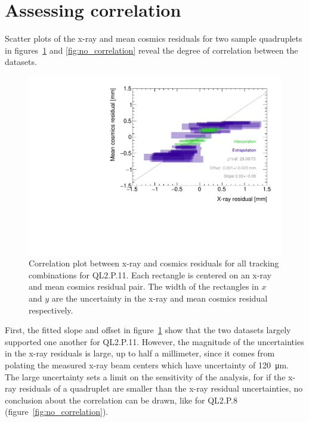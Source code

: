 \section{Assessing correlation}
Scatter plots of the x-ray and mean cosmics residuals for two sample quadruplets in figures~\ref{fig:correlation} and \ref{fig:no_correlation} reveal the degree of correlation between the datasets.

\begin{figure}
    \centering
    \includegraphics[width = \textwidth]{figures/figure_QL2P11_3100V_2021-08-05_QL2P11_local_cosmic_and_xray_data_correlation_plot.pdf}
    \caption{Correlation plot between x-ray and cosmics residuals for all tracking combinations for QL2.P.11. Each rectangle is centered on an x-ray and mean cosmics residual pair. The width of the rectangles in $x$ and $y$ are the uncertainty in the x-ray and mean cosmics residual respectively.}
    \label{fig:correlation}
\end{figure}

First, the fitted slope and offset in figure~\ref{fig:correlation} show that the two datasets largely supported one another for QL2.P.11. However, the magnitude of the uncertainties in the x-ray residuals is large, up to half a millimeter, since it comes from polating the measured x-ray beam centers which have uncertainty of \SI{120}{\micro\meter}. The large uncertainty sets a limit on the sensitivity of the analysis, for if the x-ray residuals of a quadruplet are smaller than the x-ray residual uncertainties, no conclusion about the correlation can be drawn, like for QL2.P.8 (figure~\ref{fig:no_correlation}).

